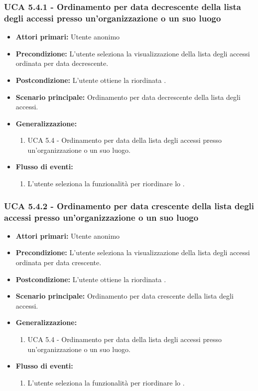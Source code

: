 \subsubsection{UCA 5.4.1 - Ordinamento per data decrescente della lista degli accessi presso un'organizzazione o un suo luogo}
\begin{itemize}
	\item \textbf{Attori primari:} Utente anonimo
	\item \textbf{Precondizione:} L'utente seleziona la visualizzazione della lista degli accessi ordinata per data decrescente.
	\item \textbf{Postcondizione:} L'utente ottiene la  riordinata .
	\item \textbf{Scenario principale:} Ordinamento per data decrescente della lista degli accessi.
	\item \textbf{Generalizzazione:}
	\begin{enumerate}
		\item UCA 5.4 - Ordinamento per data della lista degli accessi presso un'organizzazione o un suo luogo.
	\end{enumerate}
	\item \textbf{Flusso di eventi:}
	\begin{enumerate}
		\item L'utente seleziona la funzionalità per riordinare lo  .
	\end{enumerate}   
\end{itemize}

\subsubsection{UCA 5.4.2 - Ordinamento per data crescente della lista degli accessi presso un'organizzazione o un suo luogo}
\begin{itemize}
    \item \textbf{Attori primari:} Utente anonimo
    \item \textbf{Precondizione:} L'utente seleziona la visualizzazione della lista degli accessi ordinata per data crescente.
    \item \textbf{Postcondizione:} L'utente ottiene la  riordinata .
    \item \textbf{Scenario principale:} Ordinamento per data crescente della lista degli accessi.
    \item \textbf{Generalizzazione:}
	\begin{enumerate}
		\item UCA 5.4 - Ordinamento per data della lista degli accessi presso un'organizzazione o un suo luogo.
	\end{enumerate}
    \item \textbf{Flusso di eventi:}
    \begin{enumerate}
        \item L'utente seleziona la funzionalità per riordinare lo  .
    \end{enumerate}
\end{itemize}

